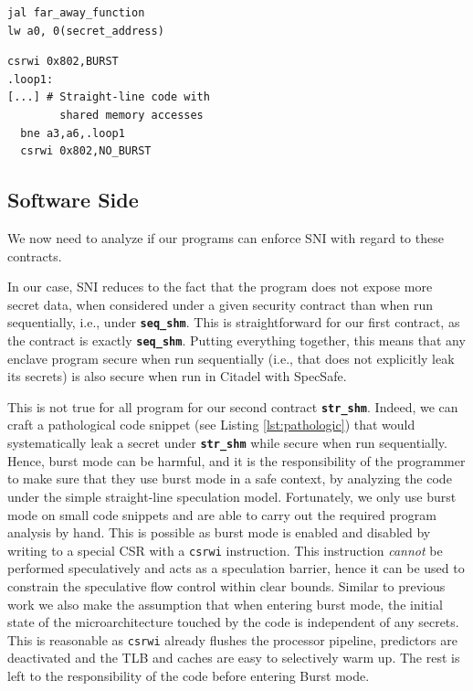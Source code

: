 \noindent 
\begin{minipage}[tbh]{.23\textwidth} %
\begin{lstlisting}[language={[RISC-V]Assembler}, caption={Pathological Insecure Code for Burst Mode}, label={lst:pathologic}]
jal far_away_function
lw a0, 0(secret_address)
\end{lstlisting}
\end{minipage}%
\hfill %
\begin{minipage}[tbh]{.23\textwidth} %
\begin{lstlisting}[language={[RISC-V]Assembler}, caption={Assembly Snippet for the SHA256 library}, label={lst:codesnippet}]
  csrwi 0x802,BURST
.loop1:
[...] # Straight-line code with
        shared memory accesses
  bne a3,a6,.loop1
  csrwi 0x802,NO_BURST
\end{lstlisting}
\end{minipage}

\subsection{Software Side}

    
We now need to analyze if our programs can enforce SNI with regard to these contracts.

In our case, SNI reduces to the fact that the program does not expose more secret data, when considered under a given security contract than when run sequentially, i.e., under \textbf{\texttt{seq\_shm}}.
This is straightforward for our first contract, as the contract is exactly \textbf{\texttt{seq\_shm}}.
Putting everything together, this means that any enclave program secure when run sequentially (i.e., that does not explicitly leak its secrets) is also secure when run in Citadel with SpecSafe.

This is not true for all program for our second contract \textbf{\texttt{str\_shm}}. 
Indeed, we can craft a pathological code snippet (see Listing \ref{lst:pathologic}) that would systematically leak a secret under \textbf{\texttt{str\_shm}} while secure when run sequentially.
Hence, burst mode can be harmful, and it is the responsibility of the programmer to make sure that they use burst mode in a safe context, by analyzing the code under the simple straight-line speculation model.
Fortunately, we only use burst mode on small code snippets and are able to carry out the required program analysis by hand.
This is possible as burst mode is enabled and disabled by writing to a special CSR with a \texttt{csrwi} instruction.
This instruction \textit{cannot} be performed speculatively and acts as a speculation barrier, hence it can be used to constrain the speculative flow control within clear bounds.
Similar to previous work \cite{guarnieri2021hardware, guarnieri2020spectector} we also make the assumption that when entering burst mode, the initial state of the microarchitecture touched by the code is independent of any secrets.
This is reasonable as \texttt{csrwi} already flushes the processor pipeline, predictors are deactivated and the TLB and caches are easy to selectively warm up.
The rest is left to the responsibility of the code before entering Burst mode.


